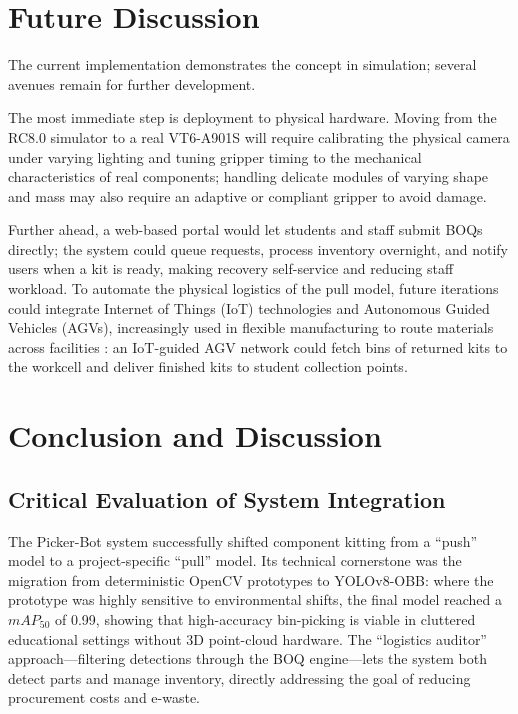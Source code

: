 \documentclass[11pt,conference]{IEEEtran}
\begin{document}
\section{Future Discussion}
The current implementation demonstrates the concept in simulation; several avenues remain for further development.

The most immediate step is deployment to physical hardware. Moving from the RC8.0 simulator to a real VT6-A901S will require calibrating the physical camera under varying lighting and tuning gripper timing to the mechanical characteristics of real components; handling delicate modules of varying shape and mass may also require an adaptive or compliant gripper to avoid damage.

Further ahead, a web-based portal would let students and staff submit BOQs directly; the system could queue requests, process inventory overnight, and notify users when a kit is ready, making recovery self-service and reducing staff workload. To automate the physical logistics of the pull model, future iterations could integrate Internet of Things (IoT) technologies and Autonomous Guided Vehicles (AGVs), increasingly used in flexible manufacturing to route materials across facilities \cite{vlachos}: an IoT-guided AGV network could fetch bins of returned kits to the workcell and deliver finished kits to student collection points.

\section{Conclusion and Discussion}
\subsection{Critical Evaluation of System Integration}
The Picker-Bot system successfully shifted component kitting from a ``push'' model to a project-specific ``pull'' model. Its technical cornerstone was the migration from deterministic OpenCV prototypes to YOLOv8-OBB: where the prototype was highly sensitive to environmental shifts, the final model reached a $mAP_{50}$ of 0.99, showing that high-accuracy bin-picking is viable in cluttered educational settings without 3D point-cloud hardware. The ``logistics auditor'' approach---filtering detections through the BOQ engine---lets the system both detect parts and manage inventory, directly addressing the goal of reducing procurement costs and e-waste.
\end{document}
